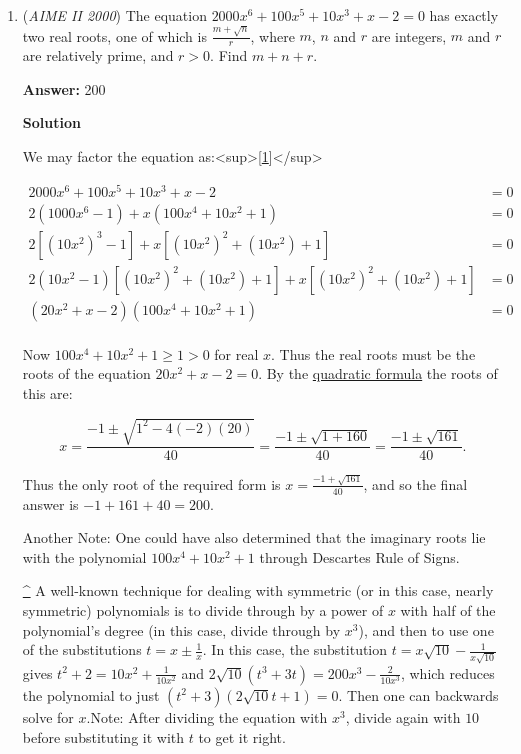 \begin{enumerate}
 -skibbysiggy

 


	\item (\textit{AIME II 2000}) The equation $2000x^6+100x^5+10x^3+x-2=0$ has exactly two real roots, one of which is $\frac{m+\sqrt{n}}r$, where $m$, $n$ and $r$ are integers, $m$ and $r$ are relatively prime, and $r>0$. Find $m+n+r$.


 
 \textbf{Answer: }200



\textbf{Solution}

We may factor the equation as:<sup>[\href{https://artofproblemsolving.com\#note\_1}{1}]</sup>

 \begin{align*} 2000x^6+100x^5+10x^3+x-2&=0\\ 2(1000x^6-1) + x(100x^4+10x^2+1)&=0\\ 2[(10x^2)^3-1]+x[(10x^2)^2+(10x^2)+1]&=0\\ 2(10x^2-1)[(10x^2)^2+(10x^2)+1]+x[(10x^2)^2+(10x^2)+1]&=0\\ (20x^2+x-2)(100x^4+10x^2+1)&=0\\ \end{align*}


 Now $100x^4+10x^2+1\ge 1>0$ for real $x$. Thus the real roots must be the roots of the equation $20x^2+x-2=0$. By the \href{https://artofproblemsolving.com/wiki/index.php?title=Quadratic\_formula}{quadratic formula} the roots of this are:

 
 \[x=\frac{-1\pm\sqrt{1^2-4(-2)(20)}}{40} = \frac{-1\pm\sqrt{1+160}}{40} = \frac{-1\pm\sqrt{161}}{40}.\]

 Thus the only root of the required form is $x=\frac{-1+\sqrt{161}}{40}$, and so the final answer is $-1+161+40 = \boxed{200}$.

 Another Note: One could have also determined that the imaginary roots lie with the polynomial $100x^4+10x^2+1$ through Descartes Rule of Signs.

 
\href{https://artofproblemsolving.com\#ref\_1}{\textasciicircum{}} A well-known technique for dealing with symmetric (or in this case, nearly symmetric) polynomials is to divide through by a power of $x$ with half of the polynomial's degree (in this case, divide through by $x^3$), and then to use one of the substitutions $t = x \pm \frac{1}{x}$. In this case, the substitution $t = x\sqrt{10} - \frac{1}{x\sqrt{10}}$ gives $t^2 + 2 = 10x^2 + \frac 1{10x^2}$ and $2\sqrt{10}(t^3 + 3t) = 200x^3 - \frac{2}{10x^3}$, which reduces the polynomial to just $(t^2 + 3)\left(2\sqrt{10}t + 1\right) = 0$. Then one can backwards solve for $x$.Note: After dividing the equation with $x^3$, divide again with $10$ before substituting it with $t$ to get it right.


\end{enumerate}
